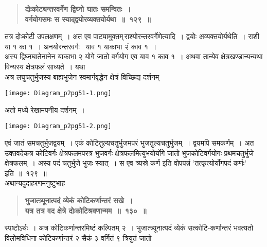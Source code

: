 \documentclass[11pt, openany]{book}
\begin{document}
\newpage

\begin{sloppypar}
 \label{8.129}
\begin{quote}
{\large \textbf{{\color{purple}दोःकोट्यन्तरवर्गेण द्विघ्नो घातः समन्वितः~।\\
वर्गयोगसमः स स्याद्द्वयोरव्यक्तयोर्यथा~॥~१२९~॥}}}
\end{quote}

तत्र दोःकोटी उपलक्षणम्~। अत एव पाट्यामुक्तम्\textendash \,राश्योरन्तरवर्गेणेत्यादि~। द्वयोः अव्यक्तयोर्यथेति~। राशी या १ का १~। अनयोरन्तरवर्गः ~याव १ याकाभा २ं काव १~।\\

अस्य द्विघ्नघातेनानेन याकाभा २ योगे जातो वर्गयोग एव याव १ काव १~। अथवा तान्येव क्षेत्रखण्डान्यन्यथा विन्यस्य क्षेत्रफलं साध्यते~। यथा\textendash \\

अत्र लघुचतुर्भुजस्य बाह्यभुजेन स्वमार्गवृद्धेन क्षेत्रं विच्छिद्य दर्शनम्

\begin{center}
    \texttt{[image: Diagram\_p2pg51-1.png]}
\end{center}

अतो मध्ये रेखामपनीय दर्शनम्~।

\begin{center}
    \texttt{[image: Diagram\_p2pg51-2.png]}
\end{center}

एवं जातं समचतुर्भुजद्वयम्~। एकं कोटितुल्यचतुर्भुजमपरं भुजतुल्यचतुर्भुजम्~। द्वयमपि समकर्णम्~। अत उक्तवदेकत्र कोटिवर्गः क्षेत्रफलमपरत्र भुजवर्गः क्षेत्रफलमित्युभयोर्योगे जातो भुजकोटिवर्गयोगः प्रथमचतुर्भुजे क्षेत्रफलम्~। अस्य पदं चतुर्भुजे भुजः स्यात्~। स एव त्र्यस्रे कर्ण इति वोपपन्नं {\color{violet}'तत्कृत्योर्योगपदं कर्णः'} इति~॥~१२९~॥\\

{\small अथान्यदुदाहरणमनुष्टुभाह\textendash }

 \label{8.130}
\begin{quote}
{\large \textbf{{\color{purple}भुजात्त्र्यूनात्पदं व्येकं कोटिकर्णान्तरं सखे~।\\
यत्र तत्र वद क्षेत्रे दोःकोटिश्रवणान्मम~॥~१३०~॥}}}
\end{quote}

स्पष्टोऽर्थः~। अत्र कोटिकर्णान्तरमिष्टं कल्पितम् २~। भुजात्त्र्यूनात्पदं व्येकं सत्कोटि-कर्णान्तरं भवत्यतो विलोमविधिना कोटिकर्णान्तरं २ सैकं ३ वर्गितं ९ त्रियुतं जातो
\end{sloppypar}
\end{document}
